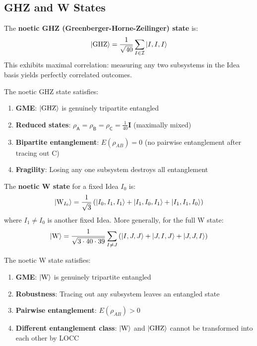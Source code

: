 \subsection{GHZ and W States}

\begin{definition}
\label{def:ghz}
The \textbf{noetic GHZ (Greenberger-Horne-Zeilinger) state} is:
\[
|\mathrm{GHZ}\rangle = \frac{1}{\sqrt{40}} \sum_{I \in \mathcal{I}} |I, I, I\rangle
\]
This exhibits maximal correlation: measuring any two subsystems in the Idea basis yields perfectly correlated outcomes.
\end{definition}

\begin{proposition}
\label{prop:ghz-props}
The noetic GHZ state satisfies:
\begin{enumerate}
  \item \textbf{GME}: $|\mathrm{GHZ}\rangle$ is genuinely tripartite entangled
  \item \textbf{Reduced states}: $\rho_\mathsf{A} = \rho_\mathsf{B} = \rho_\mathsf{C} = \frac{1}{40}\mathbf{I}$ (maximally mixed)
  \item \textbf{Bipartite entanglement}: $E(\rho_{AB}) = 0$ (no pairwise entanglement after tracing out C)
  \item \textbf{Fragility}: Losing any one subsystem destroys all entanglement
\end{enumerate}
\end{proposition}

\begin{definition}
\label{def:w-state}
The \textbf{noetic W state} for a fixed Idea $I_0$ is:
\[
|\mathrm{W}_{I_0}\rangle = \frac{1}{\sqrt{3}} \left( |I_0, I_1, I_1\rangle + |I_1, I_0, I_1\rangle + |I_1, I_1, I_0\rangle \right)
\]
where $I_1 \neq I_0$ is another fixed Idea. More generally, for the full W state:
\[
|\mathrm{W}\rangle = \frac{1}{\sqrt{3 \cdot 40 \cdot 39}} \sum_{I \neq J} \left( |I, J, J\rangle + |J, I, J\rangle + |J, J, I\rangle \right)
\]
\end{definition}

\begin{proposition}
\label{prop:w-props}
The noetic W state satisfies:
\begin{enumerate}
  \item \textbf{GME}: $|\mathrm{W}\rangle$ is genuinely tripartite entangled
  \item \textbf{Robustness}: Tracing out any subsystem leaves an entangled state
  \item \textbf{Pairwise entanglement}: $E(\rho_{AB}) > 0$
  \item \textbf{Different entanglement class}: $|\mathrm{W}\rangle$ and $|\mathrm{GHZ}\rangle$ cannot be transformed into each other by LOCC
\end{enumerate}
\end{proposition}

